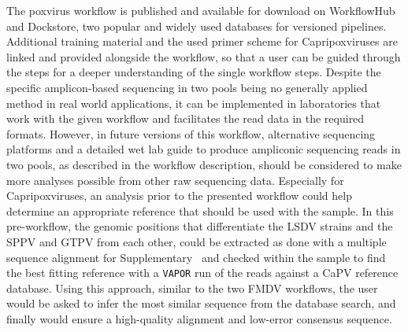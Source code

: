 The poxvirus workflow is published and available for download on WorkflowHub and Dockstore, two popular and widely used databases for versioned pipelines. Additional training material and the used primer scheme for Capripoxviruses are linked and provided alongside the workflow, so that a user can be guided through the steps for a deeper understanding of the single workflow steps. Despite the specific amplicon-based sequencing in two pools being no generally applied method in real world applications, it can be implemented in laboratories that work with the given workflow and facilitates the read data in the required formats. However, in future versions of this workflow, alternative sequencing platforms and a detailed wet lab guide to produce ampliconic sequencing reads in two pools, as described in the workflow description, should be considered to make more analyses possible from other raw sequencing data. Especially for Capripoxviruses, an analysis prior to the presented workflow could help determine an appropriate reference that should be used with the sample. In this pre-workflow, the genomic positions that differentiate the \ac{LSDV} strains and the \ac{SPPV} and \ac{GTPV} from each other, could be extracted as done with a multiple sequence alignment for Supplementary~ and checked within the sample to find the best fitting reference with a \texttt{VAPOR} run of the reads against a \ac{CaPV} reference database. Using this approach, similar to the two \ac{FMDV} workflows, the user would be asked to infer the most similar sequence from the database search, and finally would ensure a high-quality alignment and low-error consensus sequence.

